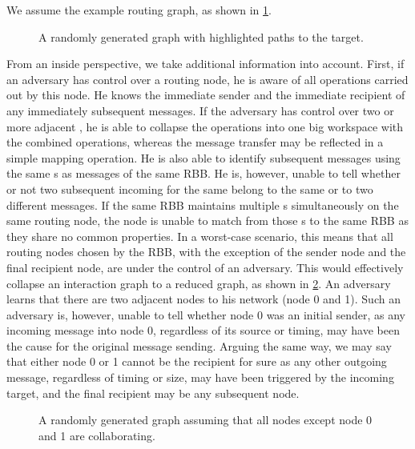 We assume the example routing graph, as shown in \cref{fig:messageGraphPaths}.

\begin{figure}[!t]\centering
	\resizebox{.9\linewidth}{!}{
		
	}
	\caption{A randomly generated graph with highlighted paths to the target.}
	\label{fig:messageGraphPaths}
\end{figure}


From an inside perspective, we take additional information into account. First, if an adversary has control over a routing node, he is aware of all operations carried out by this node. He knows the immediate sender and the immediate recipient of any immediately subsequent messages. If the adversary has control over two or more adjacent \VortexNodes{}, he is able to collapse the operations into one big workspace with the combined operations, whereas the message transfer may be reflected in a simple mapping operation. He is also able to identify subsequent messages using the same s as messages of the same RBB. He is, however, unable to tell whether or not two subsequent incoming \VortexMessages{} for the same  belong to the same or to two different messages. If the same RBB maintains multiple s simultaneously on the same routing node, the node is unable to match from those s to the same RBB as they share no common properties. In a worst-case scenario, this means that all routing nodes chosen by the RBB, with the exception of the sender node and the final recipient node,  are under the control of an adversary. This would effectively collapse an interaction graph to a reduced graph, as shown in \cref{fig:reducedMessageGraphPaths}. An adversary learns that there are two adjacent nodes to his network (node 0 and 1). Such an adversary is, however, unable to tell whether node 0 was an initial sender, as any incoming message into node 0, regardless of its source or timing, may have been the cause for the original message sending. Arguing the same way, we may say that either node 0 or 1 cannot be the recipient for sure as any other outgoing message, regardless of timing or size, may have been triggered by the incoming target, and the final recipient may be any subsequent node.

\begin{figure}[!t]\centering
	\resizebox{.9\linewidth}{!}{
		
	}
	\caption{A randomly generated graph assuming that all nodes except node 0 and 1 are collaborating.}
	\label{fig:reducedMessageGraphPaths}
\end{figure}

